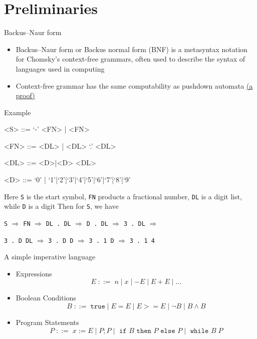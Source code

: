 \documentclass[presentation]{beamer}
\begin{document}
\section{Preliminaries}
\label{sec:org9eff8ca}
\begin{frame}[label={sec:orgca3bd4b}]{Backus–Naur form}
\begin{itemize}
\item \alert{Backus–Naur form} or \alert{Backus normal form} (BNF) is a metasyntax notation for Chomsky's context-free
grammars, often used to describe the syntax of languages used in computing
\item Context-free grammar has the same computability as pushdown automata \href{https://knightscholar.geneseo.edu/cgi/viewcontent.cgi?article=1001\&context=computability-oer}{(a proof)}
\end{itemize}
\end{frame}
\begin{frame}[label={sec:org8c87ba4},fragile]{Example}
 \begin{grammar}
<S> ::= `-' <FN> | <FN>

<FN> ::= <DL> | <DL> `.' <DL>

<DL> ::= <D>|<D> <DL>

<D> ::=  `0' | `1'|`2'|`3'|`4'|`5'|`6'|`7'|`8'|`9'
\end{grammar}
\bigskip Here \texttt{S} is the start symbol, \texttt{FN} products a fractional number, \texttt{DL} is a digit list, while \texttt{D} is a digit
Then for \texttt{S}, we have
\begin{center}
\texttt{S} \(\Rightarrow\) \texttt{FN} \(\Rightarrow\)  \texttt{DL . DL} \(\Rightarrow\) \texttt{D . DL} \(\Rightarrow\) \texttt{3 . DL} \(\Rightarrow\)\par \texttt{3 . D DL} \(\Rightarrow\) \texttt{3 . D D}  \(\Rightarrow\)
\texttt{3 . 1 D} \(\Rightarrow\) \texttt{3 . 1 4}
\end{center}
\end{frame}
\begin{frame}[label={sec:orge63ab0c}]{A simple imperative language}
\begin{itemize}
\item Expressions
\begin{equation*}
E\;::=\;n\mid x\mid -E\mid E+E\mid\dots
\end{equation*}
\item Boolean Conditions
\begin{equation*}
B\;::=\;\texttt{true}\mid E=E\mid E>= E\mid\neg B\mid B\wedge B
\end{equation*}
\item Program Statements
\begin{equation*}
P\;::=\; x:= E\mid P;P\mid\texttt{ if }B\texttt{ then }P\texttt{ else }P\mid\texttt{ while }B\; P
\end{equation*}
\end{itemize}
\end{frame}
\end{document}
